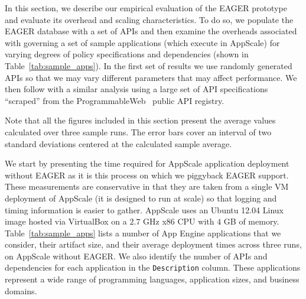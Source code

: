 In this section, we describe our empirical evaluation of the EAGER
prototype and evaluate its overhead and scaling characteristics.
To do so, we populate the EAGER database with a set of APIs and then examine
the overheads associated with governing a set of sample applications (which
execute in AppScale) for varying degrees of policy specifications and
dependencies (shown in Table~\ref{tab:sample_apps}).
In the first set of results we use randomly generated APIs so that we may vary
different parameters that may affect performance.  We then follow with a
similar analysis using a large
set of API specifications ``scraped'' from the ProgrammableWeb~\cite{pweb}
public API registry.

Note that all the figures included in this section present the average values calculated
over three sample runs. The error bars cover an interval of two standard deviations centered
at the calculated sample average.
 
We start by presenting the time required for AppScale application deployment
without EAGER as it is this process on which we piggyback EAGER support.  
These measurements are conservative in that they are taken 
from a single VM deployment of AppScale (it is designed to run at scale) so that
logging and timing information is easier to gather.  AppScale uses an
Ubuntu 12.04 Linux image hosted via VirtualBox
on a $2.7$ GHz x86 CPU with $4$ GB of memory.
Table~\ref{tab:sample_apps} lists a number of App Engine
applications that we consider, their artifact size, and their average deployment times 
across three runs, on AppScale without EAGER.
We also identify the number of APIs and dependencies for each 
application in the \texttt{Description} column.
These applications represent a wide range of programming languages,
application sizes, and business domains.  

